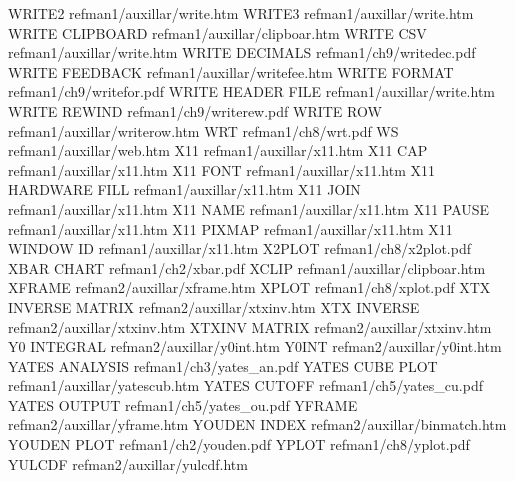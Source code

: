 WRITE2                                  refman1/auxillar/write.htm
WRITE3                                  refman1/auxillar/write.htm
WRITE CLIPBOARD                         refman1/auxillar/clipboar.htm
WRITE CSV                               refman1/auxillar/write.htm
WRITE DECIMALS                          refman1/ch9/writedec.pdf
WRITE FEEDBACK                          refman1/auxillar/writefee.htm
WRITE FORMAT                            refman1/ch9/writefor.pdf
WRITE HEADER FILE                       refman1/auxillar/write.htm
WRITE REWIND                            refman1/ch9/writerew.pdf
WRITE ROW                               refman1/auxillar/writerow.htm
WRT                                     refman1/ch8/wrt.pdf
WS                                      refman1/auxillar/web.htm
X11                                     refman1/auxillar/x11.htm
X11 CAP                                 refman1/auxillar/x11.htm
X11 FONT                                refman1/auxillar/x11.htm
X11 HARDWARE FILL                       refman1/auxillar/x11.htm
X11 JOIN                                refman1/auxillar/x11.htm
X11 NAME                                refman1/auxillar/x11.htm
X11 PAUSE                               refman1/auxillar/x11.htm
X11 PIXMAP                              refman1/auxillar/x11.htm
X11 WINDOW ID                           refman1/auxillar/x11.htm
X2PLOT                                  refman1/ch8/x2plot.pdf
XBAR CHART                              refman1/ch2/xbar.pdf
XCLIP                                   refman1/auxillar/clipboar.htm
XFRAME                                  refman2/auxillar/xframe.htm
XPLOT                                   refman1/ch8/xplot.pdf
XTX INVERSE MATRIX                      refman2/auxillar/xtxinv.htm
XTX INVERSE                             refman2/auxillar/xtxinv.htm
XTXINV MATRIX                           refman2/auxillar/xtxinv.htm
Y0 INTEGRAL                             refman2/auxillar/y0int.htm
Y0INT                                   refman2/auxillar/y0int.htm
YATES ANALYSIS                          refman1/ch3/yates_an.pdf
YATES CUBE PLOT                         refman1/auxillar/yatescub.htm
YATES CUTOFF                            refman1/ch5/yates_cu.pdf
YATES OUTPUT                            refman1/ch5/yates_ou.pdf
YFRAME                                  refman2/auxillar/yframe.htm
YOUDEN INDEX                            refman2/auxillar/binmatch.htm
YOUDEN PLOT                             refman1/ch2/youden.pdf
YPLOT                                   refman1/ch8/yplot.pdf
YULCDF                                  refman2/auxillar/yulcdf.htm
